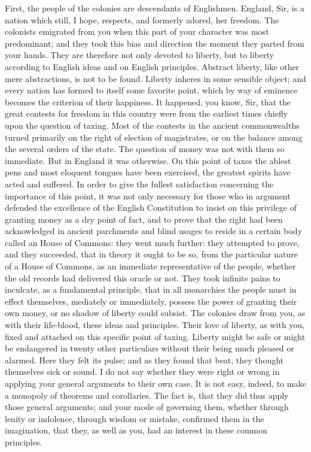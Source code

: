 First, the people of the colonies are descendants of Englishmen. England, Sir, is a nation which still, I hope, respects, and formerly adored, her freedom. The colonists emigrated from you when this part of your character was most predominant; and they took this bias and direction the moment they parted from your hands. They are therefore not only devoted to liberty, but to liberty according to English ideas and on English principles. Abstract liberty, like other mere abstractions, is not to be found. Liberty inheres in some sensible object; and every nation has formed to itself some favorite point, which by way of eminence becomes the criterion of their happiness. It happened, you know, Sir, that the great contests for freedom in this country were from the earliest times chiefly upon the question of taxing. Most of the contests in the ancient commonwealths turned primarily on the right of election of magistrates, or on the balance among the several orders of the state. The question of money was not with them so immediate. But in England it was otherwise. On this point of taxes the ablest pens and most eloquent tongues have been exercised, the greatest spirits have acted and suffered. In order to give the fullest satisfaction concerning the importance of this point, it was not only necessary for those who in argument defended the excellence of the English Constitution to insist on this privilege of granting money as a dry point of fact, and to prove that the right had been acknowledged in ancient parchments and blind usages to reside in a certain body called an House of Commons: they went much further: they attempted to prove, and they succeeded, that in theory it ought to be so, from the particular nature of a House of Commons, as an immediate representative of the people, whether the old records had delivered this oracle or not. They took infinite pains to inculcate, as a fundamental principle, that in all monarchies the people must in effect themselves, mediately or immediately, possess the power of granting their own money, or no shadow of liberty could subsist. The colonies draw from you, as with their life-blood, these ideas and principles. Their love of liberty, as with you, fixed and attached on this specific point of taxing. Liberty might be safe or might be endangered in twenty other particulars without their being much pleased or alarmed. Here they felt its pulse; and as they found that beat, they thought themselves sick or sound. I do not say whether they were right or wrong in applying your general arguments to their own case. It is not easy, indeed, to make a monopoly of theorems and corollaries. The fact is, that they did thus apply those general arguments; and your mode of governing them, whether through lenity or indolence, through wisdom or mistake, confirmed them in the imagination, that they, as well as you, had an interest in these common principles.


